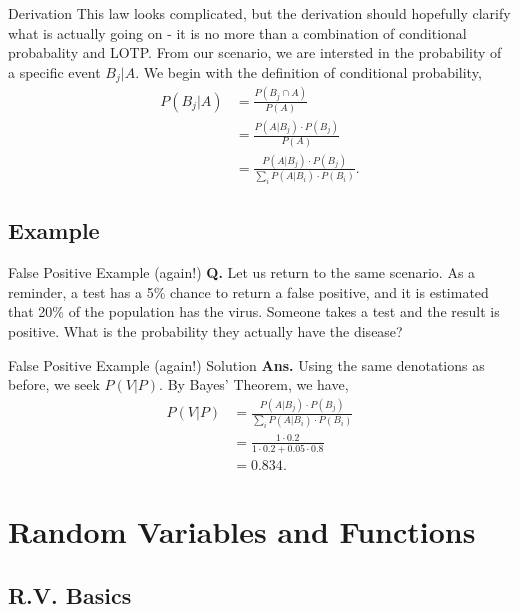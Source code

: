 \documentclass{beamer}
\begin{document}
\begin{frame}{Derivation}
    This law looks complicated, but the derivation should hopefully clarify what is actually going on - it is no more than a combination of conditional probabality and LOTP.
    \newline\newline
    From our scenario, we are intersted in the probability of a specific event $B_j|A.$ We begin with the definition of conditional probability,
    \begin{align*}
        P(B_j|A) &= \frac{P(B_j \cap A)}{P(A)} \\
        &= \frac{P(A|B_j)\cdot P(B_j)}{P(A)} \\
        &= \frac{P(A | B_j) \cdot P(B_j)}{\sum_{i} P(A | B_i) \cdot P(B_i)}.
    \end{align*}
\end{frame}

\subsection{Example}

\begin{frame}{False Positive Example (again!)}
    \textbf{Q.} Let us return to the same scenario. As a reminder, a test has a 5\% chance to return a false positive, and it is estimated that 20\% of the population has the virus. Someone takes a test and the result is positive. What is the probability they actually have the disease?
\end{frame}

\begin{frame}{False Positive Example (again!) Solution}
    \textbf{Ans.} Using the same denotations as before, we seek $P(V | P).$ By Bayes' Theorem, we have,
    \begin{align*}
        P(V|P) &= \frac{P(A | B_j) \cdot P(B_j)}{\sum_{i} P(A | B_i) \cdot P(B_i)} \\
        &= \frac{1 \cdot 0.2}{1 \cdot 0.2 + 0.05 \cdot 0.8} \\
        &= 0.834.
    \end{align*}
\end{frame}

\section{Random Variables and Functions}

\subsection{R.V. Basics}
\end{document}
